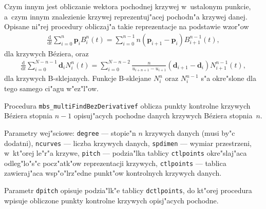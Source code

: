 Czym innym jest obliczanie wektora pochodnej krzywej w~ustalonym punkcie,
a~czym innym znalezienie krzywej reprezentuj"acej pochodn"a krzywej danej.
Opisane ni"rej procedury obliczaj"a takie reprezentacje na podstawie
wzor"ow
\begin{align}
  \frac{\mathrm{d}}{\mathrm{d}t}\sum_{i=0}^n\bm{p}_iB^n_i(t) =
  \sum_{i=0}^{n-1}n(\bm{p}_{i+1}-\bm{p}_i)B^{n-1}_{i+1}(t),
\end{align}
dla krzywych B\'{e}ziera, oraz
\begin{align}
  \frac{\mathrm{d}}{\mathrm{d}t}\sum_{i=0}^{N-n-1}\bm{d}_iN^n_i(t) =
  \sum_{i=0}^{N-n-2}\frac{n}{u_{i+n+1}-u_{i+1}}(\bm{d}_{i+1}-\bm{d}_i)
  N^{n-1}_{i+1}(t),
\end{align}
dla krzywych B-sklejanych. Funkcje B-sklejane $N^n_i$ oraz $N^{n-1}_i$ s"a
okre"slone dla tego samego ci"agu w"ez"l"ow.

\vspace{\bigskipamount}
Procedura \texttt{mbs\_multiFindBezDerivativef} oblicza punkty kontrolne
krzywych B\'{e}ziera stopnia $n-1$ opisuj"acych pochodne danych krzywych
B\'{e}ziera stopnia~$n$.

\begin{sloppypar}
Parametry wej"sciowe: \texttt{degree} --- stopie"n $n$ krzywych danych (musi
by"c dodatni),
\texttt{ncurves} --- liczba krzywych danych, \texttt{spdimen} --- wymiar
przestrzeni, w~kt"orej le"r"a krzywe, \texttt{pitch} --- podzia"lka
tablicy \texttt{ctlpoints} okre"slaj"aca odleg"lo"s"c pocz"atk"ow
reprezentacji krzywych, \texttt{ctlpoints} --- tablica zawieraj"aca
wsp"o"lrz"edne punkt"ow kontrolnych krzywych danych.
\end{sloppypar}

Parametr \texttt{dpitch} opisuje podzia"lk"e tablicy \texttt{dctlpoints}, do
kt"orej procedura wpisuje obliczone punkty kontrolne krzywych opisj"acych
pochodne.

